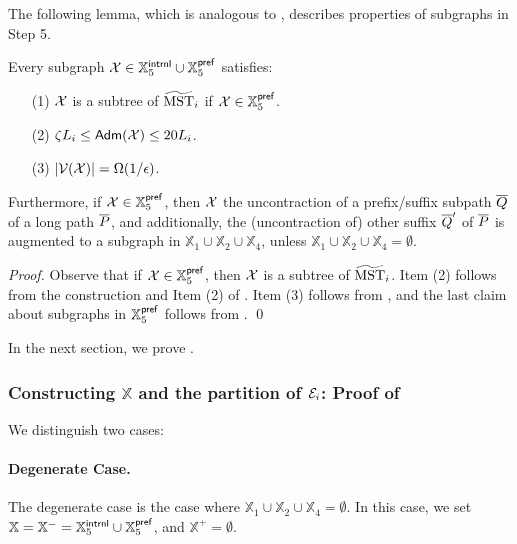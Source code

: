 The following lemma, which is analogous to , describes properties of subgraphs in Step 5.

\begin{lemma}\label{lm:Clustering-Step51E}  Every subgraph $\mathcal{X} \in \mathbb{X}_5^{\mathsf{intrnl}} \cup \mathbb{X}_5^{\mathsf{pref}}$ satisfies:
	\begin{enumerate}[noitemsep]
		\item[(1)] $\mathcal{X}$ is a subtree of $\widetilde{\mathrm{MST}}_{i}$ if $\mathcal{X}\in \mathbb{X}_5^{\mathsf{pref}}$.
		\item[(2)] $\zeta L_i \leq \mathsf{Adm}(\mathcal{X})\leq 20 L_i$.
		\item[(3)] $|\mathcal{V}(\mathcal{X})| = \Omega(1/\epsilon)$.
	\end{enumerate}
	Furthermore, if $\mathcal{X} \in \mathbb{X}_5^{\mathsf{pref}}$, then $\mathcal{X}$ the uncontraction of a prefix/suffix subpath $\overline{Q}$ of a long path $\overline{P}$, and additionally, the (uncontraction of) other suffix $\overline{Q}'$ of   $\overline{P}$ is augmented to a subgraph in $\mathbb{X}_1 \cup \mathbb{X}_2\cup \mathbb{X}_4$, unless $\mathbb{X}_1 \cup \mathbb{X}_2\cup \mathbb{X}_4 = \emptyset$.
\end{lemma}
\begin{proof} Observe that if $\mathcal{X}\in \mathbb{X}_5^{\mathsf{pref}}$, then $\mathcal{X}$ is a subtree of  $\widetilde{\mathrm{MST}}_{i}$. Item (2) follows from the construction and Item (2) of .    Item (3) follows  from , and the last claim about subgraphs in  $\mathbb{X}_5^{\mathsf{pref}}$ follows from .
	\qed
\end{proof}



In the next section, we prove . 


\subsubsection{Constructing $\mathbb{X}$ and the partition of $\mathcal{E}_i$:  Proof of }\label{subsec:X-T1E}
  We distinguish two cases:
 
 \paragraph{Degenerate Case.~} The degenerate case is the case where   $\mathbb{X}_1\cup \mathbb{X}_2\cup \mathbb{X}_4 =  \emptyset$. In this case, we set $\mathbb{X} = \mathbb{X}^{-} =  \mathbb{X}_5^{\mathsf{intrnl}} \cup \mathbb{X}_5^{\mathsf{pref}}$, and $	\mathbb{X}^{+} = 	 \emptyset$. 
 
